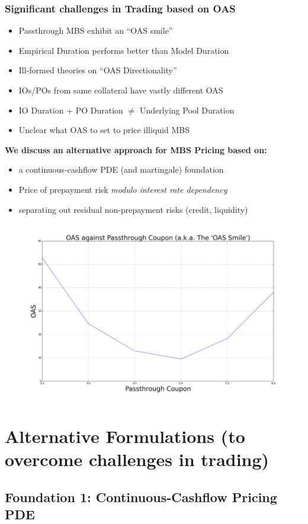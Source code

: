 \documentclass{beamer}
\begin{document}
\begin{frame}
\frametitle{Significant challenges in Trading based on OAS}
\begin{itemize}
\item Passthrough MBS exhibit an ``OAS smile''
\item Empirical Duration performs better than Model Duration
\item Ill-formed theories on ``OAS Directionality''
\item IOs/POs from same collateral have vastly different OAS
\item IO Duration + PO Duration $\neq$ Underlying Pool Duration
\item Unclear what OAS to set to price illiquid MBS
\end{itemize}
{\bf We discuss an alternative approach for MBS Pricing based on:}
\begin{itemize}
 \item a continuous-cashflow PDE (and martingale) foundation
 \item Price of prepayment risk {\em modulo interest rate dependency}
 \item separating out residual non-prepayment risks (credit, liquidity)
 \end{itemize}
\end{frame}

\begin{frame}
\includegraphics[scale=0.25]{oas_smile.png}
\end{frame}

\section{Alternative Formulations (to overcome challenges in trading)}
\subsection{Foundation 1: Continuous-Cashflow Pricing PDE}
\end{document}
